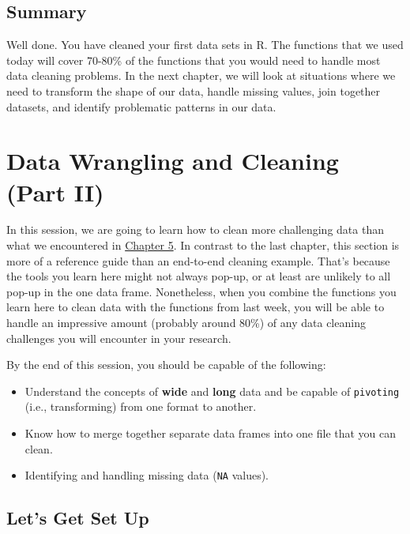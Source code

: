\documentclass[
]{book}
\begin{document}
\hypertarget{summary-5}{%
\section{Summary}\label{summary-5}}

Well done. You have cleaned your first data sets in R. The functions that we used today will cover 70-80\% of the functions that you would need to handle most data cleaning problems. In the next chapter, we will look at situations where we need to transform the shape of our data, handle missing values, join together datasets, and identify problematic patterns in our data.

\hypertarget{datacleaning2}{%
\chapter{Data Wrangling and Cleaning (Part II)}\label{datacleaning2}}

In this session, we are going to learn how to clean more challenging data than what we encountered in \protect\hyperlink{datacleaning1}{Chapter 5}. In contrast to the last chapter, this section is more of a reference guide than an end-to-end cleaning example. That's because the tools you learn here might not always pop-up, or at least are unlikely to all pop-up in the one data frame. Nonetheless, when you combine the functions you learn here to clean data with the functions from last week, you will be able to handle an impressive amount (probably around 80\%) of any data cleaning challenges you will encounter in your research.

By the end of this session, you should be capable of the following:

\begin{itemize}
\item
  Understand the concepts of \textbf{wide} and \textbf{long} data and be capable of \texttt{pivoting} (i.e., transforming) from one format to another.
\item
  Know how to merge together separate data frames into one file that you can clean.
\item
  Identifying and handling missing data (\texttt{NA} values).
\end{itemize}

\hypertarget{lets-get-set-up-1}{%
\section{Let's Get Set Up}\label{lets-get-set-up-1}}
\end{document}
